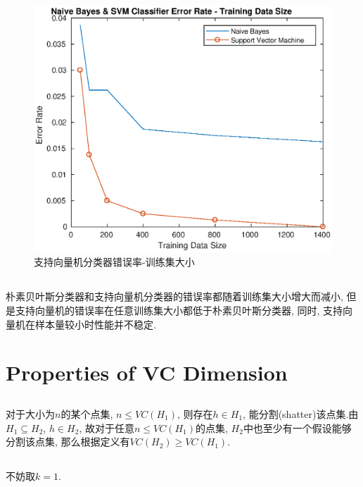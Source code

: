 \documentclass{ctexart}
\begin{document}
\begin{figure}[ht]
	\centering
	\includegraphics[scale = 1]{svm_error.eps}
	\caption{支持向量机分类器错误率-训练集大小}
\end{figure}

\subsection{}
朴素贝叶斯分类器和支持向量机分类器的错误率都随着训练集大小增大而减小, 但是支持向量机的错误率在任意训练集大小都低于朴素贝叶斯分类器, 同时, 支持向量机在样本量较小时性能并不稳定.

\section{Properties of VC Dimension}

\subsection{}

对于大小为$n$的某个点集, $n \le VC(H_1)$, 则存在$h \in H_1$, 能分割(shatter)该点集.由$H_1 \subseteq H_2$, $h \in H_2$, 故对于任意$n \le VC(H_1)$的点集, $H_2$中也至少有一个假设能够分割该点集, 那么根据定义有$VC(H_2) \ge VC(H_1)$.

\subsection{}
不妨取$k=1$.
\end{document}
